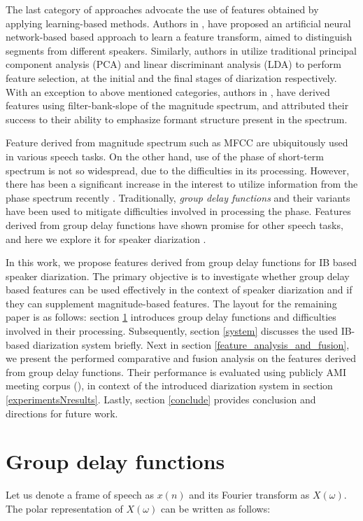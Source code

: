 \documentclass[conference]{IEEEtran}
\begin{document}
The last category of approaches advocate the use of features
obtained by applying learning-based methods. Authors in \cite{featANN}, have
proposed an artificial neural network-based based approach to learn a feature transform,
aimed to distinguish segments from different speakers. Similarly, authors in
\cite{featPCAnLDA} utilize traditional principal component analysis (PCA) and
linear discriminant analysis (LDA) to perform feature selection, at the initial
and the final stages of diarization respectively. With an exception to
above mentioned categories, authors in \cite{featFilterBank}, have derived
features using filter-bank-slope of the magnitude spectrum, and attributed their success to their ability to emphasize formant structure present in the spectrum. 

Feature derived from magnitude spectrum such as MFCC are ubiquitously used in various
speech tasks. On the other hand, use of the phase of short-term spectrum is not so
widespread, due to the difficulties in its processing.
However, there has been a significant increase in the interest to utilize
information from the phase spectrum recently
\cite{phaseImportantInterspeech14,gdSurvey}. Traditionally, \textit{group delay functions}
and their variants have been used to mitigate difficulties involved in
processing the phase. Features derived from
group delay functions have shown promise for other speech tasks, and here we 
explore it for speaker diarization \cite{modifiedGD,allPoleGdSid}. 

In this work, we propose features derived from group delay functions for IB
based speaker diarization. The primary objective is to investigate whether group
delay based features can be used effectively in the context of speaker
diarization and if they can supplement magnitude-based features. The layout for
the remaining paper is as follows: section \ref{fe} introduces group delay
functions and difficulties involved in their processing. Subsequently, section
\ref{system} discusses the used IB-based diarization system briefly. Next in
section \ref{feature_analysis_and_fusion}, we present the performed comparative
and fusion analysis on the features derived from group delay functions. Their
performance is evaluated using publicly AMI meeting corpus (\cite{AMIData}), in
context of the introduced diarization system in section
\ref{experimentsNresults}. Lastly, section \ref{conclude} provides conclusion
and directions for future work.    

\section{Group delay functions}
\label{fe}
Let us denote a frame of speech as $x(n)$ and its Fourier transform as
$X(\omega)$. The polar representation of $X(\omega)$ can be written as follows:
\end{document}
